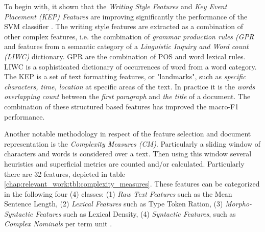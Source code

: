 To begin with, it shown that the \textit{Writing Style Features} and \textit{Key Event Placement (KEP) Features} are improving significantly the performance of the SVM classifier \parencite{dai2018fine}.  The writing style features are extracted as a combination of  other complex features, i.e. the combination of \textit{grammar production rules (GPR} and features from a semantic category of a \textit{Linguistic Inquiry and Word count (LIWC)} dictionary. GPR are the combination of POS and word lexical rules. LIWC is a sophisticated dictionary of occurrences of word from a word category. The KEP is a set of text formatting features, or "landmarks", such as \textit{specific characters, time, location} at specific areas of the text. In practice it is the \textit{words overlapping count} between the \textit{first paragraph} and \textit{the title} of a document. The combination of these structured based features has improved the macro-F1 performance.

Another notable methodology in respect of the feature selection and document representation is the \textit{Complexity Measures (CM)}. Particularly a sliding window of characters and words is considered over a text. Then using this window several heuristics and superficial metrics are counted and/or calculated. Particularly there are 32 features, depicted in table \ref{chap:relevant_work:tbl:complexity_measures}. These features can be categorized in the following four (4) classes: (1) \textit{Raw Text Features} such as the Mean Sentence Length, (2) \textit{Lexical Features} such as Type Token Ration, (3) \textit{Morpho-Syntactic Features} such as Lexical Density, (4) \textit{Syntactic Features}, such as \textit{Complex Nominals} per term unit \parencite{strobel2018text}.

